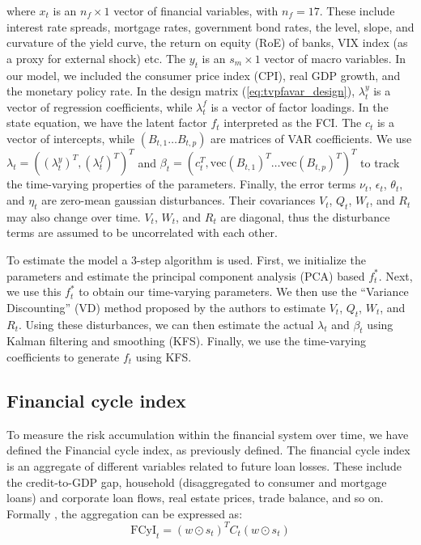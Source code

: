 where $x_t$ is an $n_f\times1$ vector of financial variables, with $n_f=17$. These include interest rate spreads, mortgage rates, government bond rates, the level, slope, and curvature of the yield curve, the return on equity (RoE) of banks, VIX index (as a proxy for external shock) etc. The $y_t$ is an $s_m\times1$ vector of macro variables. In our model, we included the consumer price index (CPI), real GDP growth, and the monetary policy rate. In the design matrix (\autoref{eq:tvpfavar_design}), $\lambda_t^y$ is a vector of regression coefficients, while $\lambda_t^f$ is a vector of factor loadings. In the state equation, we have the latent factor $f_t$ interpreted as the FCI. The $c_t$ is a vector of intercepts, while $(B_{t,1} \dots B_{t,p})$ are matrices of VAR coefficients. We use $\lambda_t=\left((\lambda_t^y)^T,(\lambda_t^f)^T \right)^T$ and $\beta_t=\left(c_t^T,\text{vec}(B_{t,1})^T \dots \text{vec}(B_{t,p})^T\right)^T$ to track the time-varying properties of the parameters. Finally, the error terms $\nu_t$, $\epsilon_t$, $\theta_t$, and $\eta_t$ are zero-mean gaussian disturbances. Their covariances $V_t$, $Q_t$, $W_t$, and $R_t$ may also change over time. $V_t$, $W_t$, and $R_t$ are diagonal, thus the disturbance terms are assumed to be uncorrelated with each other.

To estimate the model a 3-step algorithm is used. First, we initialize the parameters and estimate the principal component analysis (PCA) based $f_t^*$. Next, we use this $f_t^*$ to obtain our time-varying parameters. We then use the “Variance Discounting” (VD) method proposed by the authors \citep{koop_2013} to estimate $V_t$, $Q_t$, $W_t$, and $R_t$. Using these disturbances, we can then estimate the actual $\lambda_t$ and $\beta_t$ using Kalman filtering and smoothing (KFS). Finally, we use the time-varying coefficients to generate $f_t$ using KFS.

\subsection{Financial cycle index}
To measure the risk accumulation within the financial system over time, we have defined the Financial cycle index, as previously defined. The financial cycle index is an aggregate of different variables related to future loan losses. These include the credit-to-GDP gap, household (disaggregated to consumer and mortgage loans) and corporate loan flows, real estate prices, trade balance, and so on. Formally \citep{hollo2012}, the aggregation can be expressed as:
\begin{equation}
    \label{eq:fcyi}
    \text{FCyI}_t = (w\odot s_t)^T C_t (w\odot s_t)
\end{equation}

